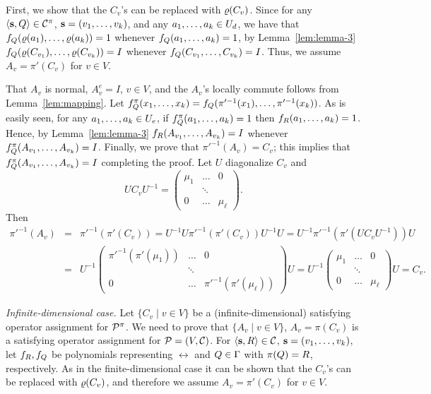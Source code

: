 First, we show that the $C_v$'s can be replaced with $\varrho(C_v)$. Since for any
$\langle {\bf s},Q \rangle\in{\mathcal C}^\pi$, ${\bf s}=(v _1,\ldots, v _{k})$, and any $a _1,\ldots, a _{k}\in U_d$, we have
that $f_Q(\varrho(a_1),\ldots,\varrho(a_k))=1$ whenever $f_Q(a _1,\ldots, a _{k})=1$, by Lemma~\ref{lem:lemma-3} $f_Q(\varrho(C_{v_1}),\ldots,\varrho(C_{v_k}))=I$ whenever $f_Q(C_{v_1},\ldots, C_{v_k})=I$. Thus, we assume $A_v=\pi'(C_v)$ for $v\in V$.

That $A_v$ is normal, $A_v^e=I$, $v\in V$, and the $A_v$'s locally commute follows from Lemma~\ref{lem:mapping}. Let $f^\pi_Q(x _1,\ldots, x _{k})=f_Q(\pi'^{-1}(x_1),\ldots,\pi'^{-1}(x_k))$. As is easily seen, for any $a _1,\ldots, a _{k}\in U_e$, if $f^\pi_Q(a _1,\ldots, a _{k})=1$ then $f_R(a _1,\ldots, a _{k})=1$. Hence, by Lemma~\ref{lem:lemma-3} $f_R(A_{v_1},\ldots, A_{v_k})=I$ whenever $f^\pi_Q(A_{v_1},\ldots, A_{v_k})=I$. Finally, we prove that $\pi'^{-1}(A_v)=C_v$; this implies that $f^\pi_Q(A_{v_1},\ldots, A_{v_k})=I$ completing the proof. Let $U$ diagonalize $C_v$ and 
\[
UC_vU^{-1}=\left(\begin{array}{ccc}\mu_1&\dots&0\\ &\ddots&\\ 0&\dots&\mu_\ell\end{array}\right).
\]
Then
\begin{eqnarray*}
\pi'^{-1}(A_v) &=& \pi'^{-1}(\pi'(C_v))=U^{-1}U\pi'^{-1}(\pi'(C_v))U^{-1}U=U^{-1}\pi'^{-1}(\pi'(UC_vU^{-1}))U\\
&=& U^{-1}\left(\begin{array}{ccc}\pi'^{-1}(\pi'(\mu_1))&\dots&0\\ &\ddots&\\ 0&\dots&\pi'^{-1}(\pi'(\mu_\ell))\end{array}\right)U
= U^{-1}\left(\begin{array}{ccc}\mu_1&\dots&0\\ &\ddots&\\ 0&\dots&\mu_\ell\end{array}\right)U=C_v.
\end{eqnarray*}

{\it Infinite-dimensional case.}
Let $\{C_v\mid v\in V\}$ be a (infinite-dimensional) satisfying operator assignment for ${\mathcal P}^\pi$. We need to prove that $\{A_v\mid v\in V\}$, $A_v=\pi(C_v)$ is a satisfying operator assignment for ${\mathcal P}=(V,{\mathcal C})$. For $\langle {\bf s},R \rangle\in{\mathcal C}$, ${\bf s}=(v _1,\ldots, v _{k})$, let $f_R,f_Q$ be polynomials representing $\rel$ and $Q\in\Gamma$ with $\pi(Q)=R$, respectively. As in the finite-dimensional case it can be shown that the $C_v$'s can be replaced with $\varrho(C_v)$, and therefore we assume $A_v=\pi'(C_v)$ for $v\in V$.

